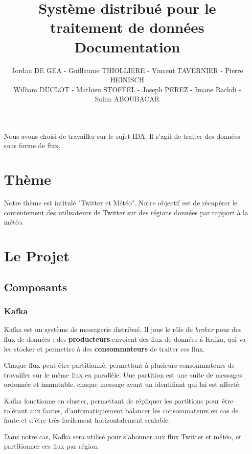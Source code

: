 \documentclass[a4paper,oneside,10pt]{article}
\title{Système distribué pour le traitement de données\\
Documentation
}
\author{Jordan DE GEA - Guillaume THIOLLIERE - Vincent TAVERNIER - Pierre HEINISCH\\
William DUCLOT - Mathieu STOFFEL - Joseph PEREZ - Imane Rachdi - Salim ABOUBACAR}
\begin{document}
\maketitle

Nous avons choisi de travailler sur le sujet IDA. Il s'agit de traiter des données sous forme de flux. \\

\section{Thème} 

Notre thème est intitulé "Twitter et Météo". Notre objectif est de récupérer le contentement des utilisateurs de Twitter sur des régions données par rapport à la météo. 

\section{Le Projet}

\subsection{Composants}

\subsubsection{Kafka}

Kafka est un système de messagerie distribué. Il joue le r\^ole de \textit{broker} pour des flux de données : des \textbf{producteurs} envoient des flux de données à Kafka, qui va les stocker et permettre à des \textbf{consommateurs} de traiter ces flux.

Chaque flux peut \^etre partitionné, permettant à plusieurs consommateurs de travailler sur le m\^eme flux en parallèle. Une partition est une suite de messages ordonnée et immutable, chaque message ayant un identifiant qui lui est affecté.

Kafka fonctionne en cluster, permettant de répliquer les partitions pour être tolérant aux fautes, d'automatiquement balancer les consommateurs en cas de faute et d'être très facilement horizontalement scalable.

Dans notre cas, Kafka sera utilisé pour s'abonner aux flux Twitter et météo, et partitionner ces flux par région.
\end{document}
